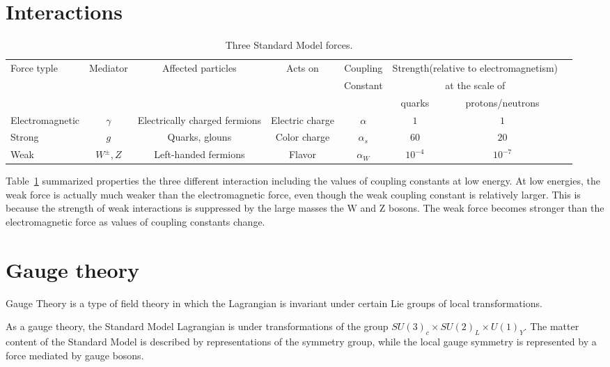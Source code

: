  

\section{Interactions}
\begin{table}[tbh]
\centering
\tiny
\begin{tabular}{|l|c|c|c|c|c|c|c}

\hline
    Force typle & Mediator & Affected particles & Acts on & Coupling&  \multicolumn{2}{c|}{Strength(relative to electromagnetism)}\\
    &&&&Constant &\multicolumn{2}{c|}{at the scale of}\\ 
    \hline
   &&&&&quarks& protons/neutrons \\
\hline
\hline
    Electromagnetic & $\gamma$&Electrically charged fermions&Electric charge& $\alpha$ &$1$&$1$\\
    Strong  & $g$ &Quarks, glouns & Color charge& $\alpha_s$ &$60$&$20$\\
    Weak & $W^{\pm}, Z$ &Left-handed fermions & Flavor& $\alpha_W$ &$10^{-4}$&$10^{-7}$\\
\hline

\end{tabular}
\caption{Three Standard Model forces. }
\label{tab:forces}
\end{table}

\par Table~\ref{tab:forces} summarized properties the three different interaction including the values of coupling constants at low energy. 
At low energies, the weak force is actually much weaker than the electromagnetic force, even though the weak coupling constant is relatively larger. 
This is because the strength of weak interactions is suppressed by the large masses the W and Z bosons. The weak force becomes stronger than the electromagnetic force as values of coupling constants change.

\section{Gauge theory}
\par Gauge Theory is a type of field theory in which the Lagrangian is invariant under certain Lie groups of local transformations.
\par As a gauge theory, the Standard Model Lagrangian is under transformations of the group $SU(3)_c \times SU(2)_L \times U(1)_Y$. The matter content of the Standard Model is described by representations of the symmetry group, while the local gauge symmetry is represented by a force mediated by gauge bosons.

